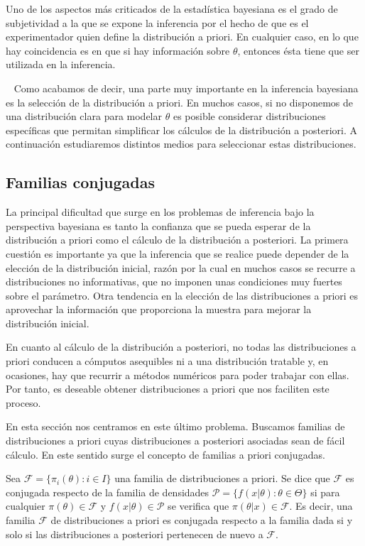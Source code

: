 \documentclass{article}
\begin{document}
Uno de los aspectos más criticados de la estadística bayesiana es el grado de subjetividad a la que se expone la inferencia por el hecho de que es el experimentador quien define la distribución a priori. En cualquier caso, en lo que hay coincidencia es en que si hay información sobre $\theta$, entonces ésta tiene que ser utilizada en la inferencia.

\ \newline
Como acabamos de decir, una parte muy importante en la inferencia bayesiana es la selección de la distribución a priori. En muchos casos, si no disponemos de una distribución clara para modelar $\theta$ es posible considerar distribuciones específicas que permitan simplificar los cálculos de la distribución a posteriori. A continuación estudiaremos distintos medios para seleccionar estas distribuciones.

\subsection{Familias conjugadas}

La principal dificultad que surge en los problemas de inferencia bajo la perspectiva bayesiana es tanto la confianza que se pueda esperar de la distribución a priori como el cálculo de la distribución a posteriori. La primera cuestión es importante ya que la inferencia que se realice puede depender de la elección de la distribución inicial, razón por la cual en muchos casos se recurre a distribuciones no informativas, que no imponen unas condiciones muy fuertes sobre el parámetro. Otra tendencia en la elección de las distribuciones a priori es aprovechar la información que proporciona la muestra para mejorar la distribución inicial.%

En cuanto al cálculo de la distribución a posteriori, no todas las distribuciones a priori conducen a cómputos asequibles ni a una distribución tratable y, en ocasiones, hay que recurrir a métodos numéricos para poder trabajar con ellas. Por tanto, es deseable obtener distribuciones a priori que nos faciliten este proceso.

En esta sección nos centramos en este último problema. Buscamos familias de distribuciones a priori cuyas distribuciones a posteriori asociadas sean de fácil cálculo. En este sentido surge el concepto de familias a priori conjugadas.

\begin{definition}
	Sea $\mathcal{F} = \{\pi_i(\theta): i\in I\}$ una familia de distribuciones a priori. Se dice que $\mathcal{F}$ es conjugada respecto de la familia de densidades $\mathcal{P} = \{f(x|\theta): \theta\in\Theta\}$ si para cualquier $\pi(\theta)\in\mathcal{F}$ y $f(x|\theta)\in \mathcal{P}$ se verifica que $\pi(\theta|x) \in \mathcal{F}$. Es decir, una familia $\mathcal{F}$ de distribuciones a priori es conjugada respecto a la familia dada si y solo si las distribuciones a posteriori pertenecen de nuevo a $\mathcal{F}$.
\end{definition}
\end{document}
